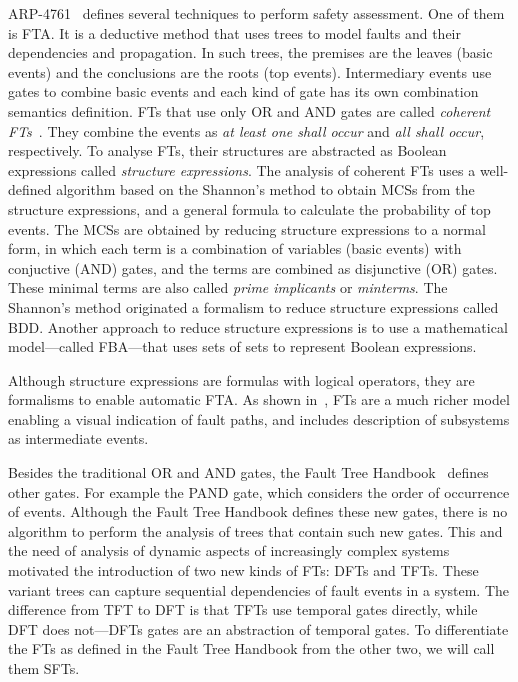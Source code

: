 \documentclass[12pt,openright,twoside,a4paper,oldfontcommands,english,brazil,final]{abntex2}
\theoremstyle{theo}
\def\FThandbook{Fault Tree Handbook~\cite{VGR+1981}\index{Fault Tree!Handbook}%
  \gdef\FThandbook{Fault Tree Handbook\index{Fault Tree!Handbook}\xspace}%
  \xspace}
\begin{document}
ARP-4761~\cite{SAE1996b} defines several techniques to perform safety assessment.
One of them is \ac{FTA}.
It is a deductive method that uses trees to model faults and their dependencies and propagation.
In such trees, the premises are the leaves (basic events) and the conclusions are the roots (top events).
Intermediary events use gates to combine basic events and each kind of gate has its own combination semantics definition.
\Acp{FT} that use only \ac{OR} and \ac{AND} gates are called \emph{coherent \aclp{FT}}~\cite{Andrews2001,AB2003,Oliv2006,CCR2008,Vaurio2016}.
They combine the events as \emph{at least one shall occur} and \emph{all shall occur}, respectively.
To analyse \acp{FT}, their structures are abstracted as Boolean expressions called \emph{structure expressions}.
The analysis of coherent \acp{FT} uses a well-defined algorithm based on the Shannon's method to obtain \acp{MCS} from the structure expressions, and a general formula to calculate the probability of top events.
The \acp{MCS} are obtained by reducing structure expressions to a normal form, in which each term is a combination of variables (basic events) with conjuctive (\ac{AND}) gates, and the terms are combined as disjunctive (\ac{OR}) gates.
These minimal terms are also called \emph{prime implicants} or \emph{minterms}.
The Shannon's method originated a formalism to reduce structure expressions called \ac{BDD}.
Another approach to reduce structure expressions is to use a mathematical model---called \acf{FBA}---that uses sets of sets to represent Boolean expressions.

Although structure expressions are formulas with logical operators, they are formalisms to enable automatic \ac{FTA}.
As shown in~\cite{Ericson2005}, \acp{FT} are a much richer model enabling a visual indication of fault paths, and includes description of subsystems as intermediate events.

Besides the traditional \ac{OR} and \ac{AND} gates, the \FThandbook defines other gates.
For example the \ac{PAND} gate, which considers the order of occurrence of events.
Although the \FThandbook defines these new gates, there is no algorithm to perform the analysis of trees that contain such new gates.
This and the need of analysis of dynamic aspects of increasingly complex systems motivated the introduction of two new kinds of \aclp{FT}: \acp{DFT} and \acp{TFT}.
These variant trees can capture sequential dependencies of fault events in a system.
The difference from \ac{TFT} to \ac{DFT} is that \acp{TFT} use temporal gates directly, while \ac{DFT} does not---\acp{DFT} gates are an abstraction of temporal gates.
To differentiate the \aclp{FT} as defined in the \FThandbook from the other two, we will call them \acp{SFT}.
\end{document}
